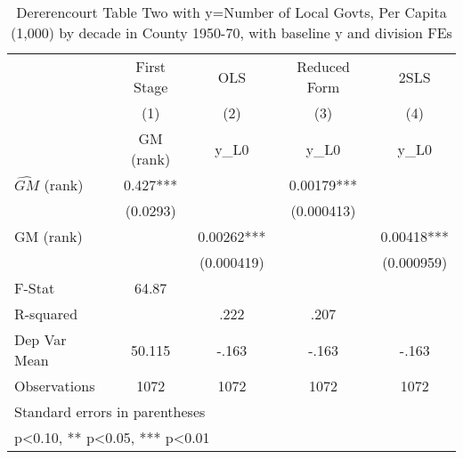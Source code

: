 \begin{table}[htbp]\centering
\def\sym#1{\ifmmode^{#1}\else\(^{#1}\)\fi}
\caption{Dererencourt Table Two with y=Number of Local Govts, Per Capita (1,000) by decade in County 1950-70, with baseline y and division FEs}
\begin{tabular}{l*{4}{c}}
\toprule
                    & First Stage   &         OLS   &Reduced Form   &        2SLS   \\
                    &\multicolumn{1}{c}{(1)}&\multicolumn{1}{c}{(2)}&\multicolumn{1}{c}{(3)}&\multicolumn{1}{c}{(4)}\\
                    &\multicolumn{1}{c}{GM  (rank)}&\multicolumn{1}{c}{y\_L0}&\multicolumn{1}{c}{y\_L0}&\multicolumn{1}{c}{y\_L0}\\
\midrule
$\hat{GM}$ (rank)   &       0.427***&               &     0.00179***&               \\
                    &    (0.0293)   &               &  (0.000413)   &               \\
\addlinespace
GM  (rank)          &               &     0.00262***&               &     0.00418***\\
                    &               &  (0.000419)   &               &  (0.000959)   \\
\midrule
F-Stat              &       64.87   &               &               &               \\
R-squared           &               &        .222   &        .207   &               \\
Dep Var Mean        &      50.115   &       -.163   &       -.163   &       -.163   \\
Observations        &        1072   &        1072   &        1072   &        1072   \\
\bottomrule
\multicolumn{5}{l}{\footnotesize Standard errors in parentheses}\\
\multicolumn{5}{l}{\footnotesize * p<0.10, ** p<0.05, *** p<0.01}\\
\end{tabular}
\end{table}

